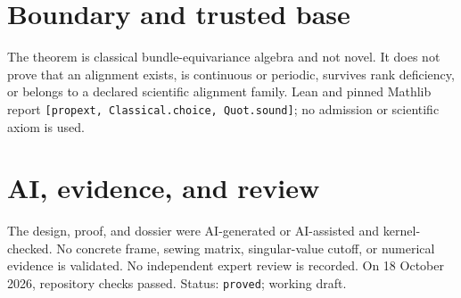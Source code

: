 \documentclass[11pt]{article}
\begin{document}
\section{Boundary and trusted base}
The theorem is classical bundle-equivariance algebra and not novel. It does not prove
that an alignment exists, is continuous or periodic, survives rank deficiency, or belongs
to a declared scientific alignment family. Lean and pinned Mathlib report
\texttt{[propext, Classical.choice, Quot.sound]}; no admission or scientific axiom is used.

\section{AI, evidence, and review}
The design, proof, and dossier were AI-generated or AI-assisted and kernel-checked. No
concrete frame, sewing matrix, singular-value cutoff, or numerical evidence is validated.
No independent expert review is recorded. On 18 October 2026, repository checks passed.
Status: \texttt{proved}; working draft.
\end{document}

